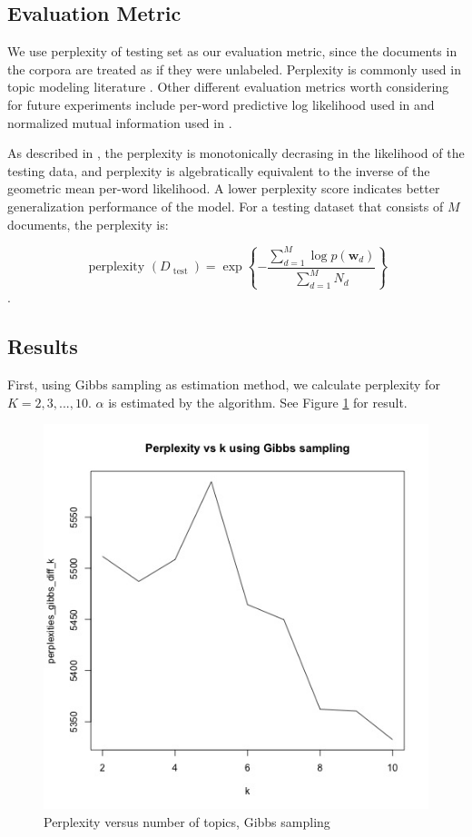 \documentclass{article}
\begin{document}
\subsection{Evaluation Metric}

We use perplexity of testing set as our evaluation metric, since the documents in the corpora are treated as if they were unlabeled. Perplexity is commonly used in topic modeling literature \cite{blei2003latent,blei2007correlated}. Other different evaluation metrics worth considering for future experiments include per-word predictive log likelihood used in \cite{wang2018general} and normalized mutual information used in \cite{lu2011investigating}.

As described in \cite{blei2003latent}, the perplexity is monotonically decrasing in the likelihood of the testing data, and perplexity is algebratically equivalent to the inverse of the geometric mean per-word likelihood. A lower perplexity score indicates better generalization performance of the model. For a testing dataset that consists of $M$ documents, the perplexity is:

$$
\text { perplexity }\left(D_{\text { test }}\right)=\exp \left\{-\frac{\sum_{d=1}^{M} \log p\left(\mathbf{w}_{d}\right)}{\sum_{d=1}^{M} N_{d}}\right\}
$$.


\subsection{Results}

First, using Gibbs sampling as estimation method, we calculate perplexity for $K = 2, 3, ..., 10$. $\alpha$ is estimated by the algorithm. See Figure \ref{fig:gibbs_diff_k_10} for result.

\begin{figure}[h]
  \centering
  \includegraphics[width=0.5\linewidth]{images/gibbs_diff_k.jpg}
  \caption{Perplexity versus number of topics, Gibbs sampling}
  \label{fig:gibbs_diff_k_10}
\end{figure}
\end{document}
